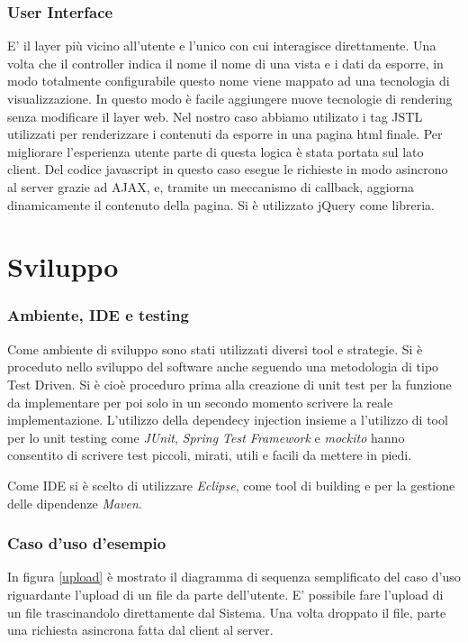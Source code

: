 \subsection{User Interface}

E' il layer più vicino all'utente e l'unico con cui interagisce
direttamente. Una volta che il controller indica il nome il nome di
una vista e i dati da esporre, in modo totalmente configurabile questo
nome viene mappato ad una tecnologia di visualizzazione. In questo
modo è facile aggiungere nuove tecnologie di rendering senza
modificare il layer web. Nel nostro caso abbiamo utilizato i tag JSTL
utilizzati per renderizzare i contenuti da esporre in una pagina html
finale.  Per migliorare l'esperienza utente parte di questa logica è
stata portata sul lato client. Del codice javascript in questo caso
esegue le richieste in modo asincrono al server grazie ad AJAX, e,
tramite un meccanismo di callback, aggiorna dinamicamente il contenuto
della pagina. Si è utilizzato jQuery come libreria.


\chapter{Sviluppo}

\subsection{Ambiente, IDE e testing}

Come ambiente di sviluppo sono stati utilizzati diversi tool e
strategie.  Si è proceduto nello sviluppo del software anche seguendo
una metodologia di tipo Test Driven. Si è cioè proceduro prima alla
creazione di unit test per la funzione da implementare per poi solo in
un secondo momento scrivere la reale implementazione. L'utilizzo della
dependecy injection insieme a l'utilizzo di tool per lo unit testing
come \emph{JUnit}, \emph{Spring Test Framework} e \emph{mockito} hanno consentito di
scrivere test piccoli, mirati, utili e facili da mettere in piedi.

Come IDE si è scelto di utilizzare \emph{Eclipse}, come
tool di building e per la gestione delle dipendenze \emph{Maven}.

\subsection{Caso d'uso d'esempio}

In figura \ref{upload} è mostrato il diagramma di sequenza
semplificato del caso d'uso riguardante l'upload di un file da parte
dell'utente. E' possibile fare l'upload di un file trascinandolo
direttamente dal Sistema. Una volta droppato il file, parte una
richiesta asincrona fatta dal client al server. 



